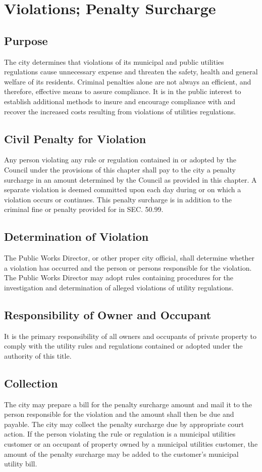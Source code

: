\setcounter{section}{97}
\section{Violations; Penalty Surcharge}
\subsection{Purpose}
The city determines that violations of its municipal and public utilities regulations cause unnecessary expense and threaten the safety, health and general welfare of its residents.  Criminal penalties alone are not always an efficient, and therefore, effective means to assure compliance.  It is in the public interest to establish additional methods to insure and encourage compliance with and recover the increased costs resulting from violations of utilities regulations.
\subsection{Civil Penalty for Violation}
Any person violating any rule or regulation contained in or adopted by the Council under the provisions of this chapter shall pay to the city a penalty surcharge in an amount determined by the Council as provided in this chapter.  A separate violation is deemed committed upon each day during or on which a violation occurs or continues.  This penalty surcharge is in addition to the criminal fine or penalty provided for in SEC. 50.99.
\subsection{Determination of Violation}
The Public Works Director, or other proper city official, shall determine whether a violation has occurred and the person or persons responsible for the violation.  The Public Works Director may adopt rules containing procedures for the investigation and determination of alleged violations of utility regulations.
\subsection{Responsibility of Owner and Occupant}
It is the primary responsibility of all owners and occupants of private property to comply with the utility rules and regulations contained or adopted under the authority of this title.
\subsection{Collection}
The city may prepare a bill for the penalty surcharge amount and mail it to the person responsible for the violation and the amount shall then be due and payable.  The city may collect the penalty surcharge due by appropriate court action.  If the person violating the rule or regulation is a municipal utilities customer or an occupant of property owned by a municipal utilities customer, the amount of the penalty surcharge may be added to the customer’s municipal utility bill.
